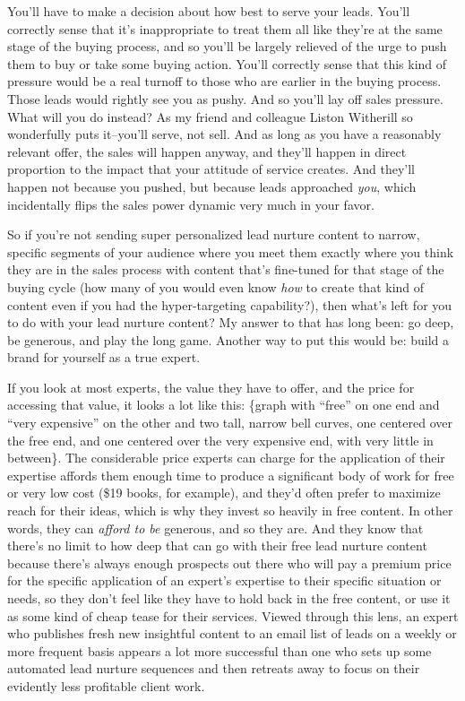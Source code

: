 You'll have to make a decision about how best to serve your leads. You'll correctly sense that it's inappropriate to treat them all like they're at the same stage of the buying process, and so you'll be largely relieved of the urge to push them to buy or take some buying action. You'll correctly sense that this kind of pressure would be a real turnoff to those who are earlier in the buying process. Those leads would rightly see you as pushy. And so you'll lay off sales pressure. What will you do instead? As my friend and colleague Liston Witherill so wonderfully puts it--you'll serve, not sell. And as long as you have a reasonably relevant offer, the sales will happen anyway, and they'll happen in direct proportion to the impact that your attitude of service creates. And they'll happen not because you pushed, but because leads approached \emph{you}, which incidentally flips the sales power dynamic very much in your favor.

So if you're not sending super personalized lead nurture content to narrow, specific segments of your audience where you meet them exactly where you think they are in the sales process with content that's fine-tuned for that stage of the buying cycle (how many of you would even know \emph{how} to create that kind of content even if you had the hyper-targeting capability?), then what's left for you to do with your lead nurture content? My answer to that has long been: go deep, be generous, and play the long game. Another way to put this would be: build a brand for yourself as a true expert.

If you look at most experts, the value they have to offer, and the price for accessing that value, it looks a lot like this: \{graph with ``free'' on one end and ``very expensive'' on the other and two tall, narrow bell curves, one centered over the free end, and one centered over the very expensive end, with very little in between\}. The considerable price experts can charge for the application of their expertise affords them enough time to produce a significant body of work for free or very low cost (\$19 books, for example), and they'd often prefer to maximize reach for their ideas, which is why they invest so heavily in free content. In other words, they can \emph{afford to be} generous, and so they are. And they know that there's no limit to how deep that can go with their free lead nurture content because there's always enough prospects out there who will pay a premium price for the specific application of an expert's expertise to their specific situation or needs, so they don’t feel like they have to hold back in the free content, or use it as some kind of cheap tease for their services. Viewed through this lens, an expert who publishes fresh new insightful content to an email list of leads on a weekly or more frequent basis appears a lot more successful than one who sets up some automated lead nurture sequences and then retreats away to focus on their evidently less profitable client work.

